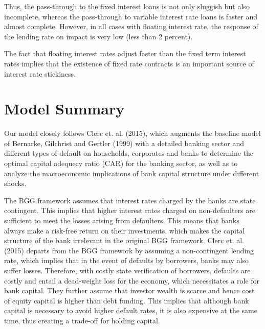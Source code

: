 \documentclass[12pt]{article}
\numberwithin{equation}{section}
\begin{document}
Thus, the pass-through to the fixed interest loans is not only sluggish but also incomplete, whereas the pass-through to variable interest rate loans is faster and almost complete. However, in all cases with floating interest rate, the response of the lending rate on impact is very low (less than 2 percent).

The fact that floating interest rates adjust faster than the fixed term interest rates implies that the existence of fixed rate contracts is an important source of interest rate stickiness. 



 
\section{Model Summary}
Our model closely follows Clerc et. al. (2015), which augments the baseline model of Bernarke, Gilchrist and Gertler (1999) with a detailed banking sector and different types of default on households, corporates and banks to determine the optimal capital adequecy ratio (CAR) for the banking sector, as well as to analyze the macroeconomic implications of bank capital structure under different shocks. 

The BGG framework assumes that interest rates charged by the banks are state contingent. This implies that higher interest rates charged on non-defaulters are sufficient to meet the losses arising from defaulters. This means that banks always make a risk-free return on their investments, which makes the capital structure of the bank irrelevant in the original BGG framework. Clerc et. al. (2015) departs from the BGG framework by assuming a non-contingent lending rate, which implies that in the event of defaults by borrowers, banks may also suffer losses. Therefore, with costly state verification of borrowers, defaults are costly and entail a dead-weight loss for the economy, which necessitates a role for bank capital. They further assume that investor wealth is scarce and hence cost of equity capital is higher than debt funding. This implies that although bank capital is necessary to avoid higher default rates, it is also expensive at the same time, thus creating a trade-off for holding capital. 
\end{document}

